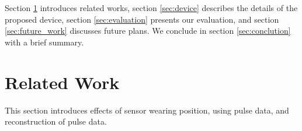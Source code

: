 \documentclass[sigconf]{acmart}
\begin{document}
Section \ref{sec:related} introduces related works, section \ref{sec:device} describes the details of the proposed device, section \ref{sec:evaluation} presents our evaluation, and section \ref{sec:future_work} discusses future plans. We conclude in section \ref{sec:conclution} with a brief summary.



\section{Related Work}
\label{sec:related}
This section introduces effects of sensor wearing position, using pulse data, and reconstruction of pulse data.

\end{document}
